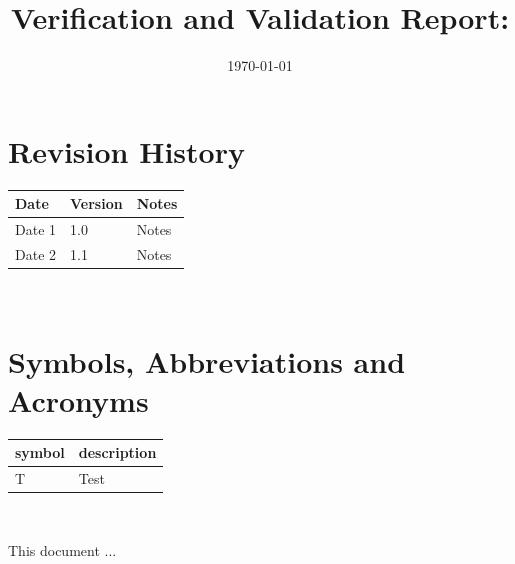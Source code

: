 \documentclass[12pt, titlepage]{article}
\begin{document}
\title{Verification and Validation Report: \progname} 
\author{\authname}
\date{\today}
	
\maketitle


\section{Revision History}

\begin{tabularx}{\textwidth}{p{3cm}p{2cm}X}
\toprule {\bf Date} & {\bf Version} & {\bf Notes}\\
\midrule
Date 1 & 1.0 & Notes\\
Date 2 & 1.1 & Notes\\
\bottomrule
\end{tabularx}

~\newpage

\section{Symbols, Abbreviations and Acronyms}

\renewcommand{\arraystretch}{1.2}
\begin{tabular}{l l} 
  \toprule		
  \textbf{symbol} & \textbf{description}\\
  \midrule 
  T & Test\\
  \bottomrule
\end{tabular}\\


\newpage

\tableofcontents

\listoftables %

\listoffigures %

\newpage


This document ...
\end{document}
